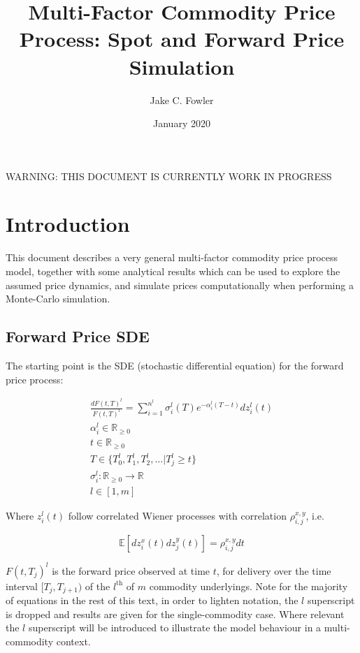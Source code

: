 \documentclass{article}
\title{Multi-Factor Commodity Price Process: Spot and Forward Price Simulation}
\author{Jake C. Fowler}
\date{January 2020}
\begin{document}
\newcommand{\+}[1]{\ensuremath{\mathbf{#1}}}

\maketitle

WARNING: THIS DOCUMENT IS CURRENTLY WORK IN PROGRESS

\tableofcontents

\newpage

\section{Introduction}
This document describes a very general multi-factor commodity price process model,
together with some analytical results which can be used to explore the assumed
price dynamics, and simulate prices computationally when performing a Monte-Carlo
simulation.

\subsection{Forward Price SDE}
The starting point is the SDE (stochastic differential equation) for the forward
price process:

\begin{align}
    \label{eq:forward_sde}
    \frac{dF(t, T)^l}{F(t, T)^l}=\sum_{i=1}^{n^l} \sigma_i^l(T)e^{-\alpha_i^l(T-t)}dz_i^l(t) \\
    \nonumber
    \alpha_i^l \in \mathbb{R}_{\ge 0} \\
    \nonumber
    t \in \mathbb{R}_{\ge 0} \\
    \nonumber
    T \in \{ T_0^l, T_1^l, T_2^l, \hdots | T_j^l \ge t  \} \\
    \nonumber
    \sigma_i^l : \mathbb{R}_{\ge 0} \rightarrow \mathbb{R} \\
    \nonumber
    l \in [1, m]
\end{align}


Where $z_i^l(t)$ follow correlated Wiener processes with correlation $\rho_{i, j}^{x, y}$, i.e.

\begin{equation}
    \mathbb{E}[dz_i^x(t)dz_j^y(t)] = \rho_{i, j}^{x, y}dt
\end{equation}

$F(t, T_j)^l$ is the forward price observed at time $t$, for delivery over the time 
interval $[T_j, T_{j+1})$ of the $l^{\text{th}}$ of $m$ commodity underlyings.
Note for the majority of equations in the rest of this text, in order to lighten
notation, the $l$ superscript is dropped and results are given for the single-commodity
case. Where relevant the $l$ superscript will be introduced to illustrate the model
behaviour in a multi-commodity context.
\end{document}
